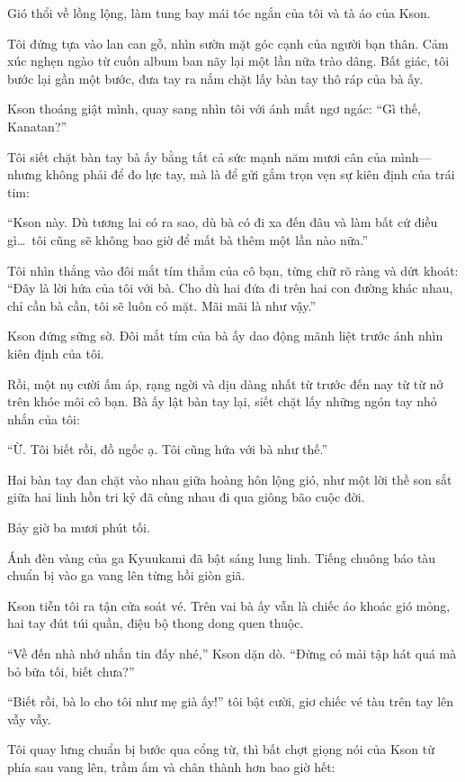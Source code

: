 \documentclass[../main.tex]{subfiles}
\begin{document}
Gió thổi về lồng lộng, làm tung bay mái tóc ngắn của tôi và tà áo của Kson.

Tôi đứng tựa vào lan can gỗ, nhìn sườn mặt góc cạnh của người bạn thân. Cảm xúc nghẹn ngào từ cuốn album ban nãy lại một lần nữa trào dâng. Bất giác, tôi bước lại gần một bước, đưa tay ra nắm chặt lấy bàn tay thô ráp của bà ấy.

Kson thoáng giật mình, quay sang nhìn tôi với ánh mắt ngơ ngác: ``Gì thế, Kanatan?''

Tôi siết chặt bàn tay bà ấy bằng tất cả sức mạnh năm mươi cân của mình—nhưng không phải để đo lực tay, mà là để gửi gắm trọn vẹn sự kiên định của trái tim:

``Kson này. Dù tương lai có ra sao, dù bà có đi xa đến đâu và làm bất cứ điều gì\dots\ tôi cũng sẽ không bao giờ để mất bà thêm một lần nào nữa.''

Tôi nhìn thẳng vào đôi mắt tím thẳm của cô bạn, từng chữ rõ ràng và dứt khoát: ``Đây là lời hứa của tôi với bà. Cho dù hai đứa đi trên hai con đường khác nhau, chỉ cần bà cần, tôi sẽ luôn có mặt. Mãi mãi là như vậy.''

Kson đứng sững sờ. Đôi mắt tím của bà ấy dao động mãnh liệt trước ánh nhìn kiên định của tôi.

Rồi, một nụ cười ấm áp, rạng ngời và dịu dàng nhất từ trước đến nay từ từ nở trên khóe môi cô bạn. Bà ấy lật bàn tay lại, siết chặt lấy những ngón tay nhỏ nhắn của tôi:

``Ừ. Tôi biết rồi, đồ ngốc ạ. Tôi cũng hứa với bà như thế.''

Hai bàn tay đan chặt vào nhau giữa hoàng hôn lộng gió, như một lời thề son sắt giữa hai linh hồn tri kỷ đã cùng nhau đi qua giông bão cuộc đời.

\ct

Bảy giờ ba mươi phút tối.

Ánh đèn vàng của ga Kyuukami đã bật sáng lung linh. Tiếng chuông báo tàu chuẩn bị vào ga vang lên từng hồi giòn giã.

Kson tiễn tôi ra tận cửa soát vé. Trên vai bà ấy vẫn là chiếc áo khoác gió mỏng, hai tay đút túi quần, điệu bộ thong dong quen thuộc.

``Về đến nhà nhớ nhắn tin đấy nhé,'' Kson dặn dò. ``Đừng có mải tập hát quá mà bỏ bữa tối, biết chưa?''

``Biết rồi, bà lo cho tôi như mẹ già ấy!'' tôi bật cười, giơ chiếc vé tàu trên tay lên vẫy vẫy.

Tôi quay lưng chuẩn bị bước qua cổng từ, thì bất chợt giọng nói của Kson từ phía sau vang lên, trầm ấm và chân thành hơn bao giờ hết:
\end{document}
